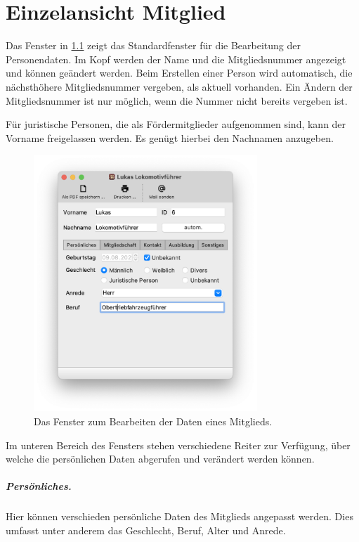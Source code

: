 \chapter{Einzelansicht Mitglied}\label{personal:person}
Das Fenster in \cref{fig:personal:person} zeigt das Standardfenster für die Bearbeitung der Personendaten.
Im Kopf werden der Name und die Mitgliedsnummer angezeigt und können geändert werden.
Beim Erstellen einer Person wird automatisch, die nächsthöhere Mitgliedsnummer vergeben, als aktuell vorhanden.
Ein Ändern der Mitgliedsnummer ist nur möglich, wenn die Nummer nicht bereits vergeben ist.

Für juristische Personen, die als Fördermitglieder aufgenommen sind, kann der Vorname freigelassen werden.
Es genügt hierbei den Nachnamen anzugeben.

\begin{figure}[!h]
  \centering
	\includegraphics[width=0.75\textwidth]{img/personal-person}
	\caption{Das Fenster zum Bearbeiten der Daten eines Mitglieds.}
	\label{fig:personal:person}
\end{figure}


Im unteren Bereich des Fensters stehen verschiedene Reiter zur Verfügung,
über welche die persönlichen Daten abgerufen und verändert werden können.

\paragraph{Persönliches.}
Hier können verschieden persönliche Daten des Mitglieds angepasst werden.
Dies umfasst unter anderem das Geschlecht, Beruf, Alter und Anrede.

